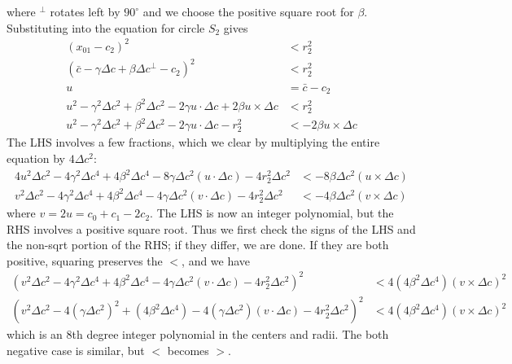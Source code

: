 \documentclass[11pt]{article}
\begin{document}
where $^\perp$ rotates left by $90^\circ$ and we choose the positive square root for $\beta$.
Substituting into the equation for circle $S_2$ gives
\begin{align*}
(x_{01} - c_2)^2 &< r_2^2 \\
(\bar{c} - \gamma \Delta c + \beta \Delta c^\perp - c_2)^2 &< r_2^2 \\
u &= \bar{c} - c_2 \\
u^2 - \gamma^2 \Delta c^2 + \beta^2 \Delta c^2 - 2\gamma u \cdot \Delta c + 2\beta u \times \Delta c &< r_2^2 \\
u^2 - \gamma^2 \Delta c^2 + \beta^2 \Delta c^2 - 2\gamma u \cdot \Delta c - r_2^2 &< -2\beta u \times \Delta c
\end{align*}
The LHS involves a few fractions, which we clear by multiplying the entire equation by $4\Delta c^2$:
\begin{align*}
4u^2 \Delta c^2 - 4\gamma^2 \Delta c^4 + 4\beta^2 \Delta c^4 - 8\gamma \Delta c^2 (u \cdot \Delta c) - 4 r_2^2 \Delta c^2 &< -8\beta \Delta c^2 (u \times \Delta c) \\
v^2 \Delta c^2 - 4\gamma^2 \Delta c^4 + 4\beta^2 \Delta c^4 - 4\gamma \Delta c^2 (v \cdot \Delta c) - 4 r_2^2 \Delta c^2 &< -4\beta \Delta c^2 (v \times \Delta c)
\end{align*}
where $v = 2u = c_0+c_1-2c_2$.
The LHS is now an integer polynomial, but the RHS involves a positive square root.  Thus we first check the signs of the LHS and the non-sqrt portion of the RHS; if they differ, we
are done.  If they are both positive, squaring preserves the $<$, and we have
\begin{align} 
\left( v^2 \Delta c^2 - 4\gamma^2 \Delta c^4 + 4\beta^2 \Delta c^4 - 4\gamma \Delta c^2 (v \cdot \Delta c) - 4 r_2^2 \Delta c^2 \right)^2 &< 4 (4\beta^2 \Delta c^4) (v \times \Delta c)^2 \\
\left( v^2 \Delta c^2 - 4(\gamma \Delta c^2)^2 + (4\beta^2 \Delta c^4) - 4(\gamma \Delta c^2) (v \cdot \Delta c) - 4 r_2^2 \Delta c^2 \right)^2 &< 4 (4\beta^2 \Delta c^4) (v \times \Delta c)^2
\label{three-circles}
\end{align}
which is an 8th degree integer polynomial in the centers and radii.  The both negative case is similar, but $<$ becomes $>$.
\end{document}
